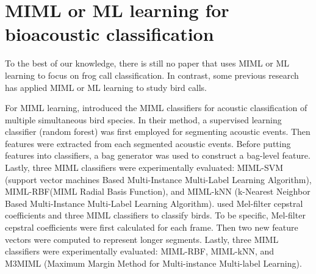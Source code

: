 \section{MIML or ML learning for bioacoustic classification}
To the best of our knowledge, there is still no paper that uses MIML or ML learning to focus on frog call classification. In contrast, some previous research has applied MIML or ML learning to study bird calls.

For MIML learning, \citep{briggs2012acoustic} introduced the MIML classifiers for acoustic classification of multiple simultaneous bird species. In their method, a supervised learning classifier (random forest) was first employed for segmenting acoustic events. Then features were extracted from each segmented acoustic events. Before putting features into classifiers, a bag generator was used to construct a bag-level feature. Lastly, three MIML classifiers were experimentally evaluated: MIML-SVM (support vector machines Based Multi-Instance Multi-Label Learning Algorithm), MIML-RBF(MIML Radial Basis Function), and MIML-kNN (k-Nearest Neighbor Based Multi-Instance Multi-Label Learning Algorithm).
\citep{dufour2013multi} used Mel-filter cepstral coefficients and three MIML classifiers to classify birds. To be specific, Mel-filter cepstral coefficients were first calculated for each frame. Then two new feature vectors were computed to represent longer segments.
Lastly, three MIML classifiers were experimentally evaluated: MIML-RBF, MIML-kNN, and M3MIML (Maximum Margin Method for Multi-instance Multi-label Learning). 

